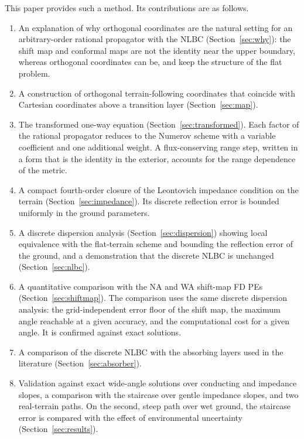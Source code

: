 \documentclass[journal]{IEEEtran}
\begin{document}
This paper provides such a method. Its contributions are as follows.
\begin{enumerate}
\item An explanation of why orthogonal coordinates are the natural setting for
an arbitrary-order rational propagator with the NLBC (Section~\ref{sec:why}):
the shift map and conformal maps are not the identity near the upper boundary,
whereas orthogonal coordinates can be, and keep the structure of the flat
problem.
\item A construction of orthogonal terrain-following coordinates that coincide
with Cartesian coordinates above a transition layer
(Section~\ref{sec:map}).
\item The transformed one-way equation (Section~\ref{sec:transformed}). Each
factor of the rational propagator reduces to the Numerov scheme with a
variable coefficient and one additional weight. A flux-conserving range step,
written in a form that is the identity in the exterior, accounts for the range
dependence of the metric.
\item A compact fourth-order closure of the Leontovich impedance condition on
the terrain (Section~\ref{sec:impedance}). Its discrete reflection error is
bounded uniformly in the ground parameters.
\item A discrete dispersion analysis (Section~\ref{sec:dispersion}) showing
local equivalence with the flat-terrain scheme and bounding the reflection
error of the ground, and a demonstration that the discrete NLBC is unchanged
(Section~\ref{sec:nlbc}).
\item A quantitative comparison with the NA and WA shift-map FD PEs
(Section~\ref{sec:shiftmap}). The comparison uses the same discrete dispersion
analysis: the grid-independent error floor of the shift map, the maximum angle
reachable at a given accuracy, and the computational cost for a given angle. It
is confirmed against exact solutions.
\item A comparison of the discrete NLBC with the absorbing layers used in the
literature (Section~\ref{sec:absorber}).
\item Validation against exact wide-angle solutions over conducting and
impedance slopes, a comparison with the staircase over gentle impedance slopes,
and two real-terrain paths. On the second, steep path over wet ground, the
staircase error is compared with the effect of environmental uncertainty
(Section~\ref{sec:results}).
\end{enumerate}

\end{document}
